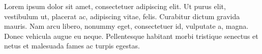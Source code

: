 {\rmfamily
Lorem ipsum dolor sit amet, consectetuer adipiscing elit. Ut purus elit,
vestibulum ut, placerat ac, adipiscing vitae, felis. Curabitur dictum gravida
mauris. Nam arcu libero, nonummy eget, consectetuer id, vulputate a, magna.
Donec vehicula augue eu neque. Pellentesque habitant morbi tristique senectus
et netus et malesuada fames ac turpis egestas.}
